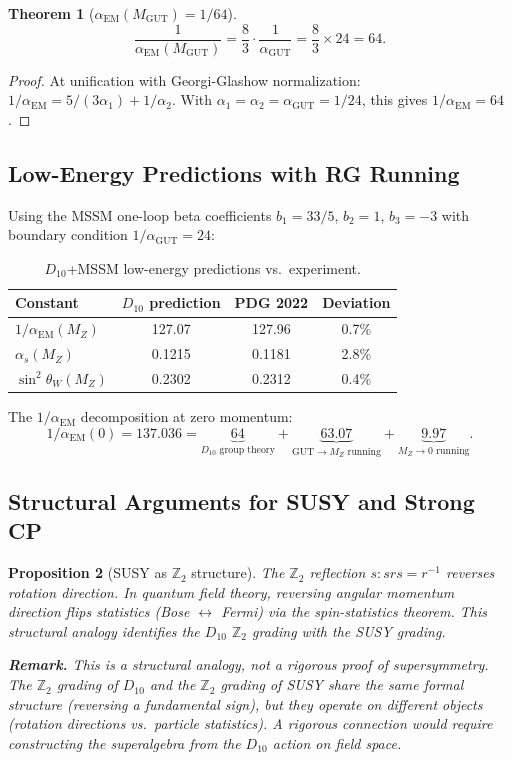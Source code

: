 \documentclass[11pt,a4paper]{article}
\newtheorem{theorem}{Theorem}
\newtheorem{proposition}[theorem]{Proposition}
\begin{document}
\begin{theorem}[$\alpha_{\text{EM}}(M_{\text{GUT}}) = 1/64$]
\[
\frac{1}{\alpha_{\text{EM}}(M_{\text{GUT}})} = \frac{8}{3} \cdot \frac{1}{\alpha_{\text{GUT}}} = \frac{8}{3} \times 24 = 64.
\]
\end{theorem}

\begin{proof}
At unification with Georgi-Glashow normalization: $1/\alpha_{\text{EM}} = 5/(3\alpha_1) + 1/\alpha_2$. With $\alpha_1 = \alpha_2 = \alpha_{\text{GUT}} = 1/24$, this gives $1/\alpha_{\text{EM}} = 64$.
\end{proof}

\subsection{Low-Energy Predictions with RG Running}

Using the MSSM one-loop beta coefficients $b_1 = 33/5$, $b_2 = 1$, $b_3 = -3$ with boundary condition $1/\alpha_{\text{GUT}} = 24$:

\begin{table}[h]
\centering
\begin{tabular}{lccc}
\toprule
Constant & $D_{10}$ prediction & PDG 2022 & Deviation \\
\midrule
$1/\alpha_{\text{EM}}(M_Z)$ & 127.07 & 127.96 & 0.7\% \\
$\alpha_s(M_Z)$ & 0.1215 & 0.1181 & 2.8\% \\
$\sin^2\theta_W(M_Z)$ & 0.2302 & 0.2312 & 0.4\% \\
\bottomrule
\end{tabular}
\caption{$D_{10}$+MSSM low-energy predictions vs.\ experiment.}
\end{table}

\noindent The $1/\alpha_{\text{EM}}$ decomposition at zero momentum:
\[ 1/\alpha_{\text{EM}}(0) = 137.036 = \underbrace{64}_{D_{10}\text{ group theory}} + \underbrace{63.07}_{\text{GUT}\to M_Z\text{ running}} + \underbrace{9.97}_{M_Z\to 0\text{ running}}.
\]

\subsection{Structural Arguments for SUSY and Strong CP}

\begin{proposition}[SUSY as $\mathbb{Z}_2$ structure]
The $\mathbb{Z}_2$ reflection $s: srs = r^{-1}$ reverses rotation direction. In quantum field theory, reversing angular momentum direction flips statistics (Bose $\leftrightarrow$ Fermi) via the spin-statistics theorem. This structural analogy identifies the $D_{10}$ $\mathbb{Z}_2$ grading with the SUSY grading.

\textbf{Remark.} This is a structural analogy, not a rigorous proof of supersymmetry. The $\mathbb{Z}_2$ grading of $D_{10}$ and the $\mathbb{Z}_2$ grading of SUSY share the same formal structure (reversing a fundamental sign), but they operate on different objects (rotation directions vs.\ particle statistics). A rigorous connection would require constructing the superalgebra from the $D_{10}$ action on field space.
\end{proposition}
\end{document}
